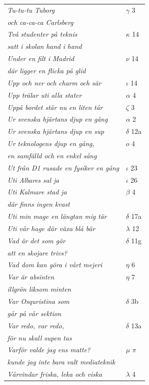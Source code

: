 \documentclass[a6paper,10pt]{article}
\begin{document}
\newpage
\begin{table}[!h]
\begin{tabular}{l l}
\textit{Tu-tu-tu Tuborg}	&$\gamma$ 3\\
\textit{och ca-ca-ca Carlsberg} &\\
\textit{Två studenter på teknis}	&$\kappa$ 14\\
\textit{satt i skolan hand i hand} &\\
\textit{Under en filt i Madrid}	&$\nu$ 14\\
\textit{där ligger en flicka på glid} &\\
\textit{Upp och ner och charm och sär}	&$\iota$ 14\\
\textit{Upp trälar uti alla stater}	&$\alpha$ 4\\
\textit{Uppå bordet står nu en liten tår}	&$\zeta$ 3\\
\textit{Ur svenska hjärtans djup en gång}	&$\alpha$ 2\\
\textit{Ur svenska hjärtans djup en sup}	&$\delta$ 12a\\
\textit{Ur teknologens djup en gång,}	&$o$ 4\\
\textit{en samfälld och en enkel sång} &\\
\textit{Ut från D1 rusade en fysiker en gång} &$\iota$ 23\\
\textit{Uti Albares sal ja} &$\iota$ 26\\
\textit{Uti Kalmare stad ja}	&$\beta$ 4\\
\textit{där finns ingen kvast} &\\
\textit{Uti min mage en längtan mig tär}	&$\delta$ 17a\\
\textit{Uti vår hage där växa blå bär}	&$\lambda$ 12\\
\textit{Vad är det som gör}	&$\delta$ 11g\\
\textit{att en skojare trivs?} &\\
\textit{Vad dom kan göra i vårt mejeri}	&$\eta$ 6\\
\textit{Var är absinten}	&$\eta$ 7\\
\textit{illgrön liksom minten} &\\
\textit{Var Osquristina som}	&$\delta$ 3b\\
\textit{går på vår sektion} &\\
\textit{Var redo, var redo,}	&$\delta$ 13a\\
\textit{för nu skall supen tas} &\\
\textit{Varför valde jag ens matte?} &$\mu$ $\pi$\\
\textit{kunde jag inte bara valt mediateknik} &\\
\textit{Vårvindar friska, leka och viska}	&$\lambda$ 4\\
\end{tabular}
\end{table}
\end{document}
